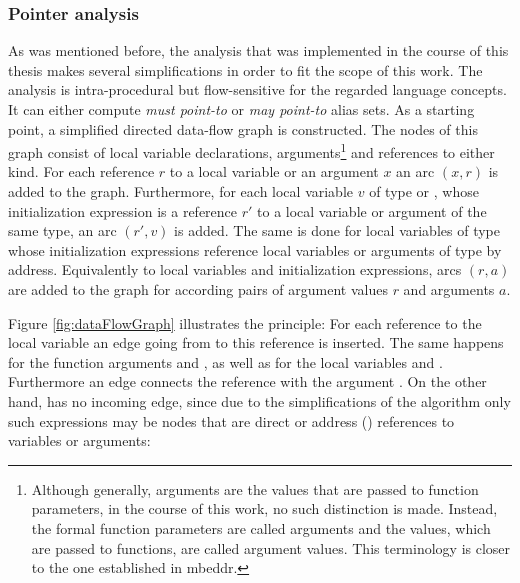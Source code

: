 \subsubsection*{Pointer analysis}
As was mentioned before, the analysis that was implemented in the course of this thesis makes several simplifications in order to fit the scope of this work. The analysis is intra-procedural but flow-sensitive for the regarded language concepts. It can either compute \textit{must point-to} or \textit{may point-to} alias sets.
As a starting point, a simplified directed data-flow graph is constructed. The nodes of this graph consist of local variable declarations, arguments\footnote{Although generally, arguments are the values that are passed to function parameters, in the course of this work, no such distinction is made. Instead, the formal function parameters are called arguments and the values, which are passed to functions, are called argument values. This terminology is closer to the one established in mbeddr.} and references to either kind. For each reference $r$ to a local variable or an argument $x$ an arc $(x, r)$ is added to the graph. Furthermore, for each local variable $v$ of type  or , whose initialization expression is a reference $r'$ to a local variable or argument of the same type, an arc $(r', v)$ is added. The same is done for local variables of type  whose initialization expressions reference local variables or arguments of type  by address. Equivalently to local variables and initialization expressions, arcs $(r, a)$ are added to the graph for according pairs of argument values $r$ and arguments $a$.

Figure \ref{fig:dataFlowGraph} illustrates the principle: For each reference to the local variable  an edge going from  to this reference is inserted. The same happens for the function arguments  and , as well as for the local variables  and . Furthermore an edge connects the  reference with the argument . On the other hand,  has no incoming edge, since due to the simplifications of the algorithm only such expressions may be nodes that are direct or address (\CODE{\&}) references to variables or arguments:

